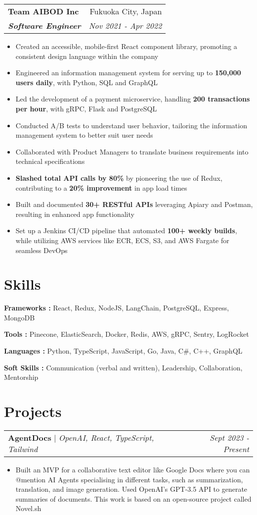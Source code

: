 \documentclass[letterpaper]{article}
\makeatletter
\newcommand{\resumeItemWithoutTitle}[1]{
  \item\small{
    {#1 \vspace{-2pt}}
  }
}
\newcommand{\resumeSubheading}[4]{
    \begin{tabular*}{\textwidth}{l@{\extracolsep{\fill}}r}
        \textbf{#1} & #2 \\
        \textbf{\textit{#3}} & \textit{\small #4} \\
    \end{tabular*}\vspace{-10pt}
}
\newcommand{\shortSection}[1]{
    \vspace{-6pt}
    \section{#1}
}
\newcommand{\projectHeading}[3]{
  \begin{tabular*}{\textwidth}{l@{\extracolsep{\fill}}r}
        \textbf{#1} 
        \hspace{-2pt} $\vert$ \hspace{-2pt} \small{\textit{#2}} 
        & 
        \textit{#3} \\
    \end{tabular*}\vspace{-2pt}
}
\newcommand*{\skill}[2]{
  \textbf{#1 : }#2 \\
  \vspace{1pt}
}
\newcommand{\resumeItemListStart}{\begin{itemize}}
\newcommand{\resumeItemListEnd}{\end{itemize}}
\makeatother
\begin{document}
\vspace{5pt}
\resumeSubheading
{Team AIBOD Inc}{Fukuoka City, Japan}
{Software Engineer}{Nov 2021 - Apr 2022}
\vspace{2pt}
\resumeItemListStart
\resumeItemWithoutTitle{Created an accessible, mobile-first React component library, promoting a consistent design language within the company}
\resumeItemWithoutTitle{Engineered an information management system for serving up to \textbf{150,000 users daily},  with Python, SQL and GraphQL}
\resumeItemWithoutTitle{Led the development of a payment microservice, handling \textbf{200 transactions per hour}, with gRPC, Flask and PostgreSQL}
\resumeItemWithoutTitle{Conducted A/B tests to understand user behavior, tailoring the information management system to better suit user needs}
\resumeItemWithoutTitle{Collaborated with Product Managers to translate business requirements into technical specifications}
\resumeItemWithoutTitle{\textbf{Slashed total API calls by 80\%} by pioneering the use of Redux, contributing to a \textbf{20\% improvement} in app load times}
\resumeItemWithoutTitle{Built and documented \textbf{30+ RESTful APIs} leveraging Apiary and Postman, resulting in enhanced app functionality}
\resumeItemWithoutTitle{Set up a Jenkins CI/CD pipeline that automated \textbf{100+ weekly builds}, while utilizing AWS services like ECR, ECS, S3, and AWS Fargate for seamless DevOps}
\resumeItemListEnd



\shortSection{Skills}
\skill {Frameworks}{React, Redux, NodeJS, LangChain, PostgreSQL, Express, MongoDB}
\skill {Tools\hspace{32pt}}{Pinecone, ElasticSearch, Docker, Redis, AWS, gRPC, Sentry, LogRocket}
\skill {Languages \hspace{4pt}}{Python, TypeScript, JavaScript, Go, Java, C\#, C++, GraphQL}
\skill {Soft Skills\hspace{10pt}}{Communication (verbal and written), Leadership, Collaboration, Mentorship}



\shortSection{Projects}

\vspace{3pt}
\projectHeading {AgentDocs}{OpenAI, React, TypeScript, Tailwind}{Sept 2023 - Present}
\resumeItemListStart
\resumeItemWithoutTitle{Built an MVP for a collaborative text editor like Google Docs where you can @mention AI Agents specialising in different tasks, such as summarization, translation, and image generation. Used OpenAI's GPT-3.5 API to generate summaries of documents. This work is based on an open-source project called Novel.sh}
\resumeItemListEnd
\end{document}
